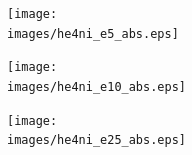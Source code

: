 \begin{minipage}[t]{.32\textwidth}
\begin{figure}{\par \resizebox*{0.75\textwidth}{!}
{\texttt{[image: \\images/he4ni\_e5\_abs.eps]}} \par}
\end{figure}
\end{minipage}
\begin{minipage}[t]{.32\textwidth}
\begin{figure}{\par \resizebox*{0.75\textwidth}{!}
{\texttt{[image: \\images/he4ni\_e10\_abs.eps]}} \par}
\end{figure}
\end{minipage}
\begin{minipage}[t]{.32\textwidth}
\begin{figure}{\par \resizebox*{0.75\textwidth}{!}
{\texttt{[image: \\images/he4ni\_e25\_abs.eps]}} \par}
\end{figure}
\end{minipage}

\vspace{0.5cm}

